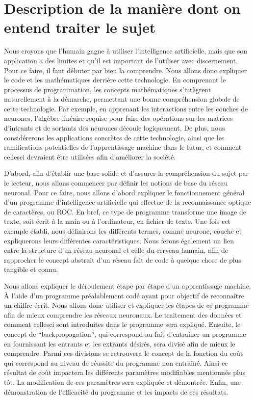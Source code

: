 \documentclass[letterpaper,10pt,french]{sphinxmanual}
\begin{document}
\section{Description de la manière dont on entend traiter le sujet}
\label{\detokenize{description:description-de-la-maniere-dont-on-entend-traiter-le-sujet}}\label{\detokenize{description::doc}}
Nous croyons que l’humain gagne à utiliser l’intelligence artificielle, mais que son application a des limites et qu’il est important de l’utiliser avec discernement. Pour ce faire, il faut débuter par bien la comprendre. Nous allons donc expliquer le code et les mathématiques derrière cette technologie. En comprenant le processus de programmation, les concepts mathématiques s’intègrent naturellement à la démarche, permettant une bonne compréhension globale de cette technologie. Par exemple, en apprenant les interactions entre les couches de neurones, l’algèbre linéaire requise pour faire des opérations sur les matrices d’intrants et de sortants des neurones découle logiquement. De plus, nous considérerons les applications concrètes de cette technologie, ainsi que les ramifications potentielles de l’apprentissage machine dans le futur, et comment celles\sphinxhyphen{}ci devraient être utilisées afin d’améliorer la société.

D’abord, afin d’établir une base solide et d’assurer la compréhension du sujet par le lecteur, nous allons commencer par définir les notions de base du réseau neuronal. Pour ce faire, nous allons d’abord expliquer le fonctionnement général d’un programme d’intelligence artificielle qui effectue de la reconnaissance optique de caractères, ou ROC. En bref, ce type de programme transforme une image de texte, soit écrit à la main ou à l’ordinateur, en fichier de texte. Une fois cet exemple établi, nous définirons les différents termes, comme neurone, couche et expliquerons leurs différentes caractéristiques. Nous ferons également un lien entre la structure d’un réseau neuronal et celle du cerveau humain, afin de rapprocher le concept abstrait d’un réseau fait de code à quelque chose de plus tangible et connu. 

Nous allons expliquer le déroulement étape par étape d’un apprentissage machine. À l’aide d’un programme préalablement codé ayant pour objectif de reconnaître un chiffre écrit. Nous allons donc utiliser et expliquer les étapes de ce programme afin de mieux comprendre les réseaux neuronaux. Le  traitement des données et comment celles\sphinxhyphen{}ci sont introduites dans le programme sera expliqué. Ensuite, le concept de “backpropagation”, qui correspond au fait d’entraîner un programme en fournissant les entrants et les extrants désirés, sera divisé afin de mieux le comprendre.  Parmi ces divisions se retrouvera le concept de la fonction du coût qui correspond au niveau de réussite du programme non entraîné. Ainsi ce résultat de coût impactera les différents paramètres modifiables mentionnés plus tôt. La modification de ces paramètres sera expliquée et démontrée. Enfin, une démonstration de l’efficacité du programme et les impacts de ces résultats.
\end{document}
